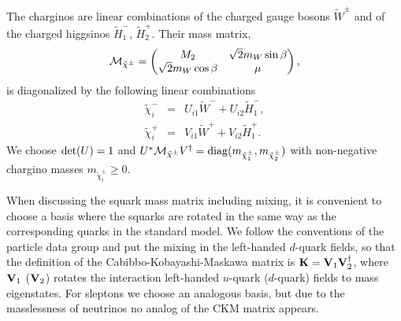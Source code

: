 \documentclass[a4paper,10pt,oneside]{book}
\begin{document}
The charginos are linear combinations of the charged gauge bosons ${\tilde
  W^\pm}$ and of the charged higgsinos ${\tilde H_1^-}$, ${\tilde H_2^+}$.
Their mass matrix,
\begin{eqnarray}
  {\cal M}_{\tilde{\chi}^\pm} = 
  \left( \begin{matrix} %
  {M_2} & \sqrt{2} m_W \sin\beta \cr 
  \sqrt{2} m_W \cos\beta & \mu 
  \end{matrix} %
  \right) ,
\end{eqnarray}
is diagonalized by the following linear combinations
\begin{eqnarray}
  \tilde{\chi}^-_i & = & U_{i1} \tilde{W}^- + U_{i2} \tilde{H}_1^- , \\
  \tilde{\chi}^+_i & = & V_{i1} \tilde{W}^+ + V_{i2} \tilde{H}_1^+ .
\end{eqnarray}
We choose ${\rm det}(U)=1$ and $U^* {\cal M}_{\tilde{\chi}^\pm}
V^\dagger = {\rm diag} ( m_{\tilde{\chi}^\pm_1},
m_{\tilde{\chi}^\pm_2} )$ with non-negative chargino masses $
m_{\tilde{\chi}^\pm_i} \ge 0$.

When discussing the squark mass matrix including mixing, it is
convenient to choose a basis where the squarks are rotated in the same
way as the corresponding quarks in the standard model.  We follow the
conventions of the particle data group \cite{Olive:2016xmw} and put the mixing
in the left-handed $d$-quark fields, so that the definition of the
Cabibbo-Kobayashi-Maskawa matrix is $\mbox{\bf K}= \mbox{\bf V}_1
\mbox{\bf V}_2^\dagger$, where $\mbox{\bf V}_1$ ($\mbox{\bf V}_2$)
rotates the interaction left-handed $u$-quark ($d$-quark) fields to
mass eigenstates.  For sleptons we choose an analogous basis, but due
to the masslessness of neutrinos no analog of the CKM matrix appears.
 
\end{document}
